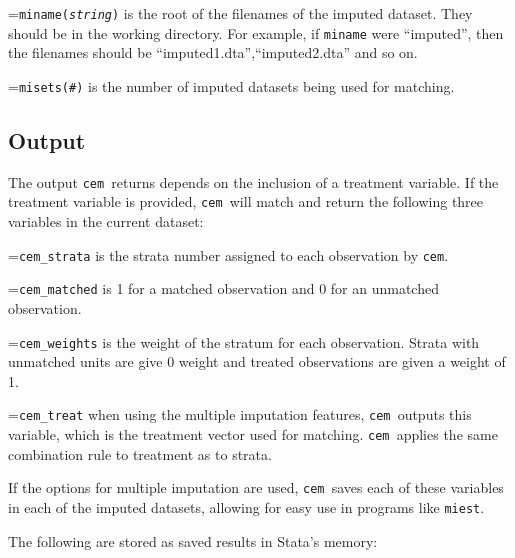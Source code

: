 \documentclass[11pt,titlepage]{article}
\newcommand{\cem}{\texttt{cem }}
\begin{document}
\hangindent=\parindent{}\noindent\texttt{miname({\it string})} is the root of the filenames of the
imputed dataset. They should be in the working directory. For example, if
\texttt{miname} were ``imputed'', then the filenames should be
``imputed1.dta'',``imputed2.dta'' and so on.  

\hangindent=\parindent{}\noindent\texttt{misets(\#)} is the number of imputed datasets being
used for matching.

\subsection{Output}

The output \cem returns depends on the inclusion of a treatment variable.
If the treatment variable is provided, \cem will match and return the
following three variables in the current dataset:

\hangindent=\parindent{}\noindent\texttt{cem\_strata} is the strata number assigned to each
observation by \texttt{cem}.
  
\hangindent=\parindent{}\noindent\texttt{cem\_matched} is 1 for a matched observation and 0 for an
unmatched observation.
  
\hangindent=\parindent{}\noindent\texttt{cem\_weights} is the weight of the stratum for each
observation.  Strata with unmatched units are give 0 weight and treated
observations are given a weight of 1.
  
\hangindent=\parindent{}\noindent\texttt{cem\_treat} when using the multiple imputation features,
\cem outputs this variable, which is the treatment vector used for
matching. \cem applies the same combination rule to treatment as to
strata.

If the options for multiple imputation are used, \cem saves each of these
variables in each of the imputed datasets, allowing for easy use in programs
like \texttt{miest}.

The following are stored as saved results in Stata's memory:
\end{document}
